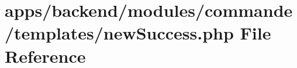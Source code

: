 \hypertarget{backend_2modules_2commande_2templates_2new_success_8php}{\section{apps/backend/modules/commande/templates/new\-Success.php File Reference}
\label{backend_2modules_2commande_2templates_2new_success_8php}
}
